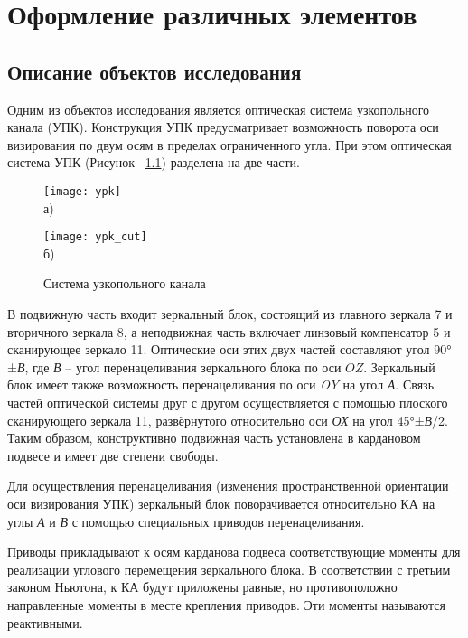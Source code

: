 \chapter{Оформление различных элементов}\label{ch:ch1}

\section{Описание объектов исследования}\label{sec:ch1/sec1}

Одним из объектов исследования является оптическая система узкопольного канала (УПК). Конструкция УПК предусматривает возможность поворота оси визирования по двум осям в пределах ограниченного угла. При этом оптическая система УПК (Рисунок ~\cref{fig:ypk-pic}) разделена на две части. 

\begin{figure}[ht]
	\begin{minipage}[b][][b]{0.49\linewidth}\centering
		\texttt{[image: ypk]} \\ а)
	\end{minipage}
	\hfill
	\begin{minipage}[b][][b]{0.49\linewidth}\centering
		\texttt{[image: ypk\_cut]} \\ б)
	\end{minipage}
	\caption{Система узкопольного канала}
	\label{fig:ypk-pic}
\end{figure}
В подвижную часть входит зеркальный блок, состоящий из главного зеркала 7 и вторичного зеркала 8, а неподвижная часть включает линзовый компенсатор 5 и сканирующее зеркало 11. Оптические оси этих двух частей составляют угол 90°±\textit{В}, где \textit{В} – угол перенацеливания зеркального блока по оси $OZ$. Зеркальный блок имеет также возможность перенацеливания по оси \textit{OY} на угол \textit{А}. Связь частей оптической системы друг с другом осуществляется с помощью плоского сканирующего зеркала 11, развёрнутого относительно оси \textit{ОХ} на угол 45°±\textit{В}/2. Таким образом, конструктивно подвижная часть установлена в кардановом подвесе и имеет две степени свободы.

Для осуществления перенацеливания (изменения пространственной ориентации оси визирования УПК) зеркальный блок поворачивается относительно КА на углы \textit{А} и \textit{В} с помощью специальных приводов перенацеливания.

Приводы прикладывают к осям карданова подвеса соответствующие моменты для реализации углового перемещения зеркального блока. В соответствии с третьим законом Ньютона, к КА будут приложены равные, но противоположно направленные моменты в месте крепления приводов. Эти моменты называются реактивными.

